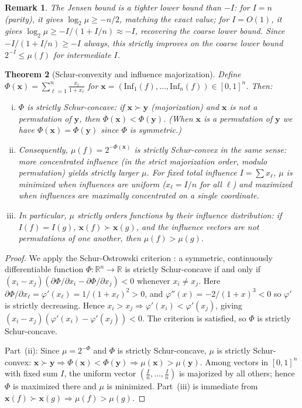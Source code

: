 \documentclass[11pt]{article}
\newtheorem{theorem}{Theorem}[section]
\newtheorem{remark}[theorem]{Remark}
\newcommand{\R}{\mathbb{R}}
\newcommand{\Inf}{\mathrm{Inf}}
\begin{document}
\begin{remark}
The Jensen bound is a tighter lower bound than $-I$: for $I = n$ (parity), it gives $\log_2 \mu \ge -n/2$, matching the exact value; for $I = O(1)$, it gives $\log_2 \mu \ge -I/(1+I/n) \approx -I$, recovering the coarse lower bound. Since $-I/(1+I/n) \ge -I$ always, this strictly improves on the coarse lower bound $2^{-I} \le \mu(f)$ for intermediate $I$.
\end{remark}

\begin{theorem}[Schur-convexity and influence majorization]
\label{thm:schur}
Define $\Phi(\mathbf{x}) = \sum_{\ell=1}^n \frac{x_\ell}{1 + x_\ell}$ for $\mathbf{x} = (\Inf_1(f), \ldots, \Inf_n(f)) \in [0,1]^n$. Then:
\begin{enumerate}[(i)]
    \item $\Phi$ is \emph{strictly Schur-concave}: if $\mathbf{x} \succ \mathbf{y}$ (majorization) and $\mathbf{x}$ is not a permutation of $\mathbf{y}$, then $\Phi(\mathbf{x}) < \Phi(\mathbf{y})$. (When $\mathbf{x}$ is a permutation of $\mathbf{y}$ we have $\Phi(\mathbf{x}) = \Phi(\mathbf{y})$ since $\Phi$ is symmetric.)
    \item Consequently, $\mu(f) = 2^{-\Phi(\mathbf{x})}$ is \emph{strictly Schur-convex} in the same sense: more concentrated influence (in the strict majorization order, modulo permutation) yields strictly larger $\mu$. For fixed total influence $I = \sum x_\ell$, $\mu$ is minimized when influences are uniform ($x_\ell = I/n$ for all $\ell$) and maximized when influences are maximally concentrated on a single coordinate.
    \item In particular, $\mu$ strictly orders functions by their influence distribution: if $I(f) = I(g)$, $\mathbf{x}(f) \succ \mathbf{x}(g)$, and the influence vectors are not permutations of one another, then $\mu(f) > \mu(g)$.
\end{enumerate}
\end{theorem}

\begin{proof}
We apply the Schur-Ostrowski criterion \cite{marshall2011inequalities}: a symmetric, continuously differentiable function $\Phi:\R^n \to \R$ is strictly Schur-concave if and only if $(x_i - x_j)(\partial \Phi/\partial x_i - \partial \Phi/\partial x_j) < 0$ whenever $x_i \neq x_j$. Here $\partial \Phi/\partial x_\ell = \varphi'(x_\ell) = 1/(1+x_\ell)^2 > 0$, and $\varphi''(x) = -2/(1+x)^3 < 0$ so $\varphi'$ is strictly decreasing. Hence $x_i > x_j \Rightarrow \varphi'(x_i) < \varphi'(x_j)$, giving $(x_i - x_j)(\varphi'(x_i) - \varphi'(x_j)) < 0$. The criterion is satisfied, so $\Phi$ is strictly Schur-concave.

Part~(ii): Since $\mu = 2^{-\Phi}$ and $\Phi$ is strictly Schur-concave, $\mu$ is strictly Schur-convex: $\mathbf{x} \succ \mathbf{y} \Rightarrow \Phi(\mathbf{x}) < \Phi(\mathbf{y}) \Rightarrow \mu(\mathbf{x}) > \mu(\mathbf{y})$. Among vectors in $[0,1]^n$ with fixed sum $I$, the uniform vector $(\frac{I}{n}, \ldots, \frac{I}{n})$ is majorized by all others; hence $\Phi$ is maximized there and $\mu$ is minimized. Part~(iii) is immediate from $\mathbf{x}(f) \succ \mathbf{x}(g) \Rightarrow \mu(f) > \mu(g)$.
\end{proof}
\end{document}
